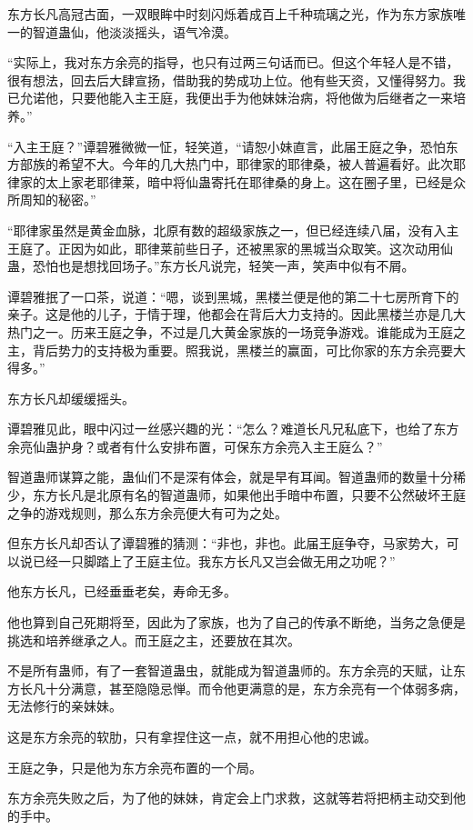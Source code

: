 \begin{this_body}
东方长凡高冠古面，一双眼眸中时刻闪烁着成百上千种琉璃之光，作为东方家族唯一的智道蛊仙，他淡淡摇头，语气冷漠。

“实际上，我对东方余亮的指导，也只有过两三句话而已。但这个年轻人是不错，很有想法，回去后大肆宣扬，借助我的势成功上位。他有些天资，又懂得努力。我已允诺他，只要他能入主王庭，我便出手为他妹妹治病，将他做为后继者之一来培养。”

“入主王庭？”谭碧雅微微一怔，轻笑道，“请恕小妹直言，此届王庭之争，恐怕东方部族的希望不大。今年的几大热门中，耶律家的耶律桑，被人普遍看好。此次耶律家的太上家老耶律莱，暗中将仙蛊寄托在耶律桑的身上。这在圈子里，已经是众所周知的秘密。”

“耶律家虽然是黄金血脉，北原有数的超级家族之一，但已经连续八届，没有入主王庭了。正因为如此，耶律莱前些日子，还被黑家的黑城当众取笑。这次动用仙蛊，恐怕也是想找回场子。”东方长凡说完，轻笑一声，笑声中似有不屑。

谭碧雅抿了一口茶，说道：“嗯，谈到黑城，黑楼兰便是他的第二十七房所育下的亲子。这是他的儿子，于情于理，他都会在背后大力支持的。因此黑楼兰亦是几大热门之一。历来王庭之争，不过是几大黄金家族的一场竞争游戏。谁能成为王庭之主，背后势力的支持极为重要。照我说，黑楼兰的赢面，可比你家的东方余亮要大得多。”

东方长凡却缓缓摇头。

谭碧雅见此，眼中闪过一丝感兴趣的光：“怎么？难道长凡兄私底下，也给了东方余亮仙蛊护身？或者有什么安排布置，可保东方余亮入主王庭么？”

智道蛊师谋算之能，蛊仙们不是深有体会，就是早有耳闻。智道蛊师的数量十分稀少，东方长凡是北原有名的智道蛊师，如果他出手暗中布置，只要不公然破坏王庭之争的游戏规则，那么东方余亮便大有可为之处。

但东方长凡却否认了谭碧雅的猜测：“非也，非也。此届王庭争夺，马家势大，可以说已经一只脚踏上了王庭主位。我东方长凡又岂会做无用之功呢？”

他东方长凡，已经垂垂老矣，寿命无多。

他也算到自己死期将至，因此为了家族，也为了自己的传承不断绝，当务之急便是挑选和培养继承之人。而王庭之主，还要放在其次。

不是所有蛊师，有了一套智道蛊虫，就能成为智道蛊师的。东方余亮的天赋，让东方长凡十分满意，甚至隐隐忌惮。而令他更满意的是，东方余亮有一个体弱多病，无法修行的亲妹妹。

这是东方余亮的软肋，只有拿捏住这一点，就不用担心他的忠诚。

王庭之争，只是他为东方余亮布置的一个局。

东方余亮失败之后，为了他的妹妹，肯定会上门求救，这就等若将把柄主动交到他的手中。


\end{this_body}
